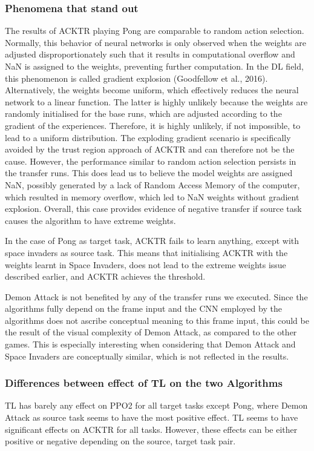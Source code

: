 \subsubsection*{Phenomena that stand out}
The results of ACKTR playing Pong are comparable to random action selection. Normally, this behavior of neural networks is only observed when the weights are adjusted disproportionately such that it results in computational overflow and NaN is assigned to the weights, preventing further computation. In the DL field, this phenomenon is called gradient explosion (Goodfellow et al., 2016). Alternatively, the weights become uniform, which effectively reduces the neural network to a linear function. The latter is highly unlikely because the weights are randomly initialised for the base runs, which are adjusted according to the gradient of the experiences. Therefore, it is highly unlikely, if not impossible, to lead to a uniform distribution. 
The exploding gradient scenario is specifically avoided by the trust region approach of ACKTR and can therefore not be the cause. However, the performance similar to random action selection persists in the transfer runs. This does lead us to believe the model weights are assigned NaN, possibly generated by a lack of Random Access Memory of the computer, which resulted in memory overflow, which led to NaN weights without gradient explosion. Overall, this case provides evidence of negative transfer if source task causes the algorithm to have extreme weights.

In the case of Pong as target task, ACKTR fails to learn anything, except with space invaders as source task. This means that initialising ACKTR with the weights learnt in Space Invaders, does not lead to the extreme weights issue described earlier, and ACKTR achieves the threshold. 

Demon Attack is not benefited by any of the transfer runs we executed. Since the algorithms fully depend on the frame input and the CNN employed by the algorithms does not ascribe conceptual meaning to this frame input, this could be the result of the visual complexity of Demon Attack, as compared to the other games. This is especially interesting when considering that Demon Attack and Space Invaders are conceptually similar, which is not reflected in the results. 

\subsubsection*{Differences between effect of TL on the two Algorithms}
TL has barely any effect on PPO2 for all target tasks except Pong, where Demon Attack as source task seems to have the most positive effect.
TL seems to have significant effects on ACKTR for all tasks. However, these effects can be either positive or negative depending on the source, target task pair.

